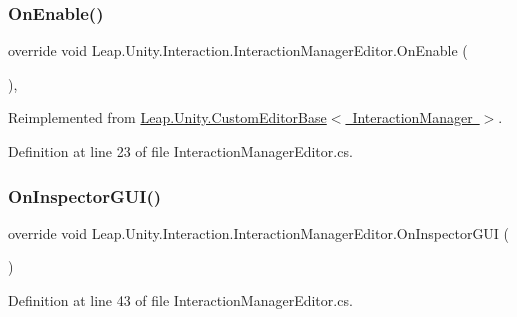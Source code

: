 \mbox{\label{class_leap_1_1_unity_1_1_interaction_1_1_interaction_manager_editor_a98a39c4b467e4b97d93f012753141fc1}} 
\subsubsection{\texorpdfstring{OnEnable()}{OnEnable()}}
{\footnotesize\ttfamily override void Leap.\+Unity.\+Interaction.\+Interaction\+Manager\+Editor.\+On\+Enable (\begin{DoxyParamCaption}{ }\end{DoxyParamCaption})\hspace{0.3cm}{\ttfamily [protected]}, {\ttfamily [virtual]}}



Reimplemented from \mbox{\hyperlink{class_leap_1_1_unity_1_1_custom_editor_base_a2268bc01655342bd3da5ae015bfa2f93}{Leap.\+Unity.\+Custom\+Editor\+Base$<$ Interaction\+Manager $>$}}.



Definition at line 23 of file Interaction\+Manager\+Editor.\+cs.

\mbox{\label{class_leap_1_1_unity_1_1_interaction_1_1_interaction_manager_editor_aa72499eea4104ced9f3697918162f100}} 
\subsubsection{\texorpdfstring{OnInspectorGUI()}{OnInspectorGUI()}}
{\footnotesize\ttfamily override void Leap.\+Unity.\+Interaction.\+Interaction\+Manager\+Editor.\+On\+Inspector\+G\+UI (\begin{DoxyParamCaption}{ }\end{DoxyParamCaption})}



Definition at line 43 of file Interaction\+Manager\+Editor.\+cs.

